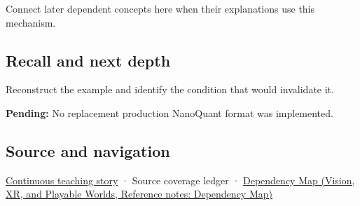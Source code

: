 Connect later dependent concepts here when their explanations use this mechanism.

\subsection{Recall and next depth}\label{appendix-590bbb2424c1-recall-and-next-depth}

Reconstruct the example and identify the condition that would invalidate it.

\textbf{Pending:} No replacement production NanoQuant format was implemented.

\subsection{Source and navigation}\label{appendix-590bbb2424c1-source-and-navigation}

\hyperref[01-foundations-i-ch002-bytes-become-a-durable-agreement]{Continuous teaching story} · {Source coverage ledger} · \href{../07-Vision-XR-and-Playable-Worlds/main.pdf\#nameddest=appendix-4ad47bdd269a}{Dependency Map (Vision, XR, and Playable Worlds, Reference notes: Dependency Map)}
